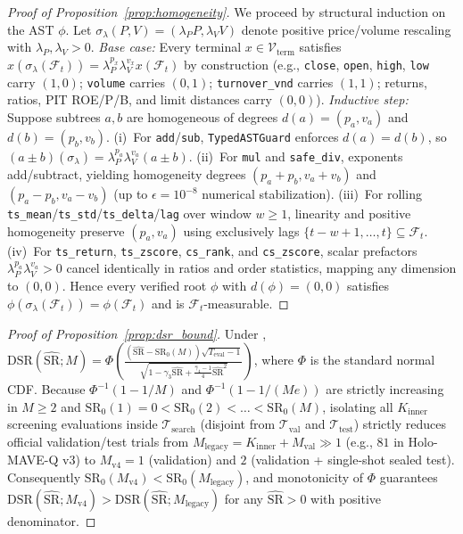 \documentclass[11pt]{article}
\begin{document}
\begin{proof}[Proof of Proposition~\ref{prop:homogeneity}]
We proceed by structural induction on the AST $\phi$. Let $\sigma_{\lambda}(P, V) = (\lambda_P P, \lambda_V V)$ denote positive price/volume rescaling with $\lambda_P, \lambda_V > 0$.
\emph{Base case:} Every terminal $x \in \mathcal{V}_{\text{term}}$ satisfies $x(\sigma_\lambda(\mathcal{F}_t)) = \lambda_P^{p_x} \lambda_V^{v_x} x(\mathcal{F}_t)$ by construction (e.g., \texttt{close}, \texttt{open}, \texttt{high}, \texttt{low} carry $(1,0)$; \texttt{volume} carries $(0,1)$; \texttt{turnover\_vnd} carries $(1,1)$; returns, ratios, PIT ROE/P/B, and limit distances carry $(0,0)$).
\emph{Inductive step:} Suppose subtrees $a, b$ are homogeneous of degrees $d(a)=(p_a, v_a)$ and $d(b)=(p_b, v_b)$.
(i)~For \texttt{add}/\texttt{sub}, \texttt{TypedASTGuard} enforces $d(a)=d(b)$, so $(a \pm b)(\sigma_\lambda) = \lambda_P^{p_a}\lambda_V^{v_a}(a \pm b)$.
(ii)~For \texttt{mul} and \texttt{safe\_div}, exponents add/subtract, yielding homogeneity degrees $(p_a+p_b, v_a+v_b)$ and $(p_a-p_b, v_a-v_b)$ (up to $\epsilon=10^{-8}$ numerical stabilization).
(iii)~For rolling \texttt{ts\_mean}/\texttt{ts\_std}/\texttt{ts\_delta}/\texttt{lag} over window $w \ge 1$, linearity and positive homogeneity preserve $(p_a, v_a)$ using exclusively lags $\{t-w+1,\dots,t\} \subseteq \mathcal{F}_t$.
(iv)~For \texttt{ts\_return}, \texttt{ts\_zscore}, \texttt{cs\_rank}, and \texttt{cs\_zscore}, scalar prefactors $\lambda_P^{p_a}\lambda_V^{v_a} > 0$ cancel identically in ratios and order statistics, mapping any dimension to $(0,0)$.
Hence every verified root $\phi$ with $d(\phi)=(0,0)$ satisfies $\phi(\sigma_\lambda(\mathcal{F}_t)) = \phi(\mathcal{F}_t)$ and is $\mathcal{F}_t$-measurable.
\end{proof}

\begin{proof}[Proof of Proposition~\ref{prop:dsr_bound}]
Under \citet{bailey2014deflated}, $\text{DSR}(\widehat{\text{SR}}; M) = \Phi\!\left(\frac{(\widehat{\text{SR}} - \text{SR}_0(M))\sqrt{T_{\text{eval}}-1}}{\sqrt{1 - \hat{\gamma}_3 \widehat{\text{SR}} + \frac{\hat{\gamma}_4 - 1}{4}\widehat{\text{SR}}^2}}\right)$, where $\Phi$ is the standard normal CDF. Because $\Phi^{-1}(1 - 1/M)$ and $\Phi^{-1}(1 - 1/(Me))$ are strictly increasing in $M \ge 2$ and $\text{SR}_0(1)=0 < \text{SR}_0(2) < \dots < \text{SR}_0(M)$, isolating all $K_{\text{inner}}$ screening evaluations inside $\mathcal{T}_{\text{search}}$ (disjoint from $\mathcal{T}_{\text{val}}$ and $\mathcal{T}_{\text{test}}$) strictly reduces official validation/test trials from $M_{\text{legacy}} = K_{\text{inner}} + M_{\text{val}} \gg 1$ (e.g., $81$ in Holo-MAVE-Q v3) to $M_{\text{v4}} = 1$ (validation) and $2$ (validation + single-shot sealed test). Consequently $\text{SR}_0(M_{\text{v4}}) < \text{SR}_0(M_{\text{legacy}})$, and monotonicity of $\Phi$ guarantees $\text{DSR}(\widehat{\text{SR}}; M_{\text{v4}}) > \text{DSR}(\widehat{\text{SR}}; M_{\text{legacy}})$ for any $\widehat{\text{SR}} > 0$ with positive denominator.
\end{proof}
\end{document}
